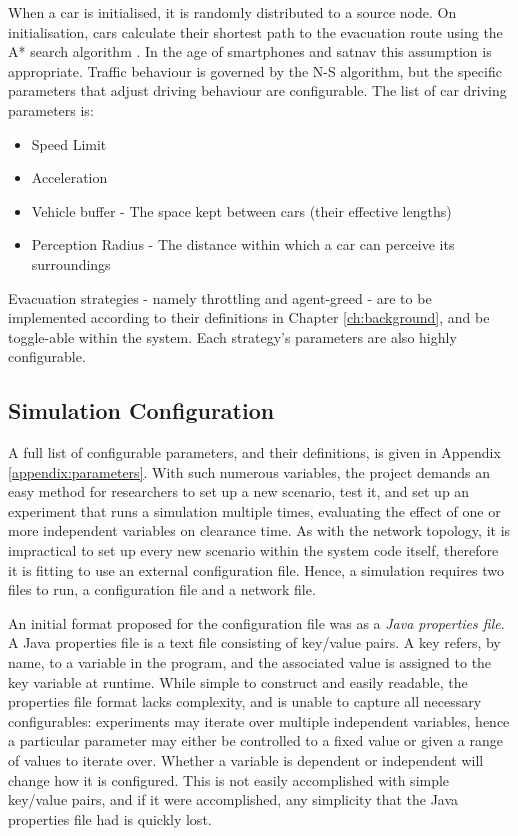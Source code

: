 When a car is initialised, it is randomly distributed to a source node. On initialisation, cars calculate their shortest path to the evacuation route using the A* search algorithm \cite{Hart1968APaths}. In the age of smartphones and satnav this assumption is appropriate. Traffic behaviour is governed by the N-S algorithm, but the specific parameters that adjust driving behaviour are configurable. The list of car driving parameters is:

\begin{itemize}
    \item Speed Limit
    \item Acceleration
    \item Vehicle buffer - The space kept between cars (their effective lengths)
    \item Perception Radius - The distance within which a car can perceive its surroundings
\end{itemize}

Evacuation strategies - namely throttling and agent-greed - are to be implemented according to their definitions in Chapter \ref{ch:background}, and be toggle-able within the system. Each strategy's parameters are also highly configurable.

\subsection{Simulation Configuration}
A full list of configurable parameters, and their definitions, is given in Appendix \ref{appendix:parameters}. With such numerous variables, the project demands an easy method for researchers to set up a new scenario, test it, and set up an experiment that runs a simulation multiple times, evaluating the effect of one or more independent variables on clearance time. As with the network topology, it is impractical to set up every new scenario within the system code itself, therefore it is fitting to use an external configuration file. Hence, a simulation requires two files to run, a configuration file and a network file. 

An initial format proposed for the configuration file was as a \textit{Java properties file}. A Java properties file is a text file consisting of key/value pairs. A key refers, by name, to a variable in the program, and the associated value is assigned to the key variable at runtime. While simple to construct and easily readable, the properties file format lacks complexity, and is unable to capture all necessary configurables: experiments may iterate over multiple independent variables, hence a particular parameter may either be controlled to a fixed value or given a range of values to iterate over. Whether a variable is dependent or independent will change how it is configured. This is not easily accomplished with simple key/value pairs, and if it were accomplished, any simplicity that the Java properties file had is quickly lost.

